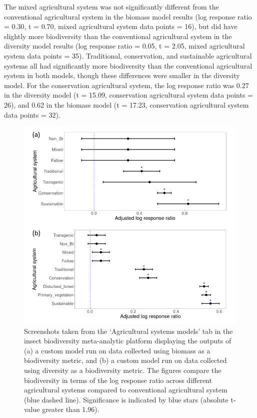 \documentclass[11pt]{article}
\begin{document}
		\noindent The mixed agricultural system was not significantly different from the conventional agricultural system in the biomass model results (log response ratio = 0.30, t = 0.70, mixed agricultural system data points = 16), but did have slightly more biodiversity than the conventional agricultural system in the diversity model results (log response ratio = 0.05, t = 2.05, mixed agricultural system data points = 35). Traditional, conservation, and sustainable agricultural systems all had significantly more biodiversity than the conventional agricultural system in both models, though these differences were smaller in the diversity model. For the conservation agricultural system, the log response ratio was 0.27 in the diversity model (t = 15.09, conservation agricultural system data points = 26), and 0.62 in the biomass model (t = 17.23, conservation agricultural system data points = 32). 
		
		\begin{figure}[H] 
			\centering 
			\includegraphics[scale=1]{figure_4_diversity_vs_biomass_models.png} 
			\caption{Screenshots taken from the ‘Agricultural systems models’ tab in the insect biodiversity meta-analytic platform displaying the outputs of (a) a custom model run on data collected using biomass as a biodiversity metric, and (b) a custom model run on data collected using diversity as a biodiversity metric. The figures compare the biodiversity in terms of the log response ratio across different agricultural systems compared to conventional agricultural system (blue dashed line). Significance is indicated by blue stars (absolute t-value greater than 1.96).}  
		\end{figure}
		
\end{document}
